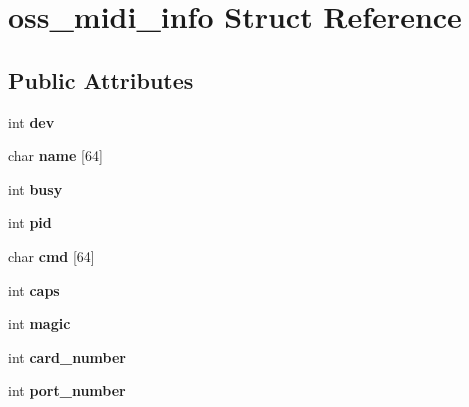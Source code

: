 \hypertarget{structoss__midi__info}{}\section{oss\+\_\+midi\+\_\+info Struct Reference}
\label{structoss__midi__info}
\subsection*{Public Attributes}
\begin{DoxyCompactItemize}
\item 
int {\bfseries dev}\hypertarget{structoss__midi__info_a9b878c6af6db4effdade6cef144bfed0}{}\label{structoss__midi__info_a9b878c6af6db4effdade6cef144bfed0}

\item 
char {\bfseries name} \mbox{[}64\mbox{]}\hypertarget{structoss__midi__info_a8613295b2ededa2d3bb5e0396fad5fbd}{}\label{structoss__midi__info_a8613295b2ededa2d3bb5e0396fad5fbd}

\item 
int {\bfseries busy}\hypertarget{structoss__midi__info_afddb92873545d2a67546df9b3ad240ee}{}\label{structoss__midi__info_afddb92873545d2a67546df9b3ad240ee}

\item 
int {\bfseries pid}\hypertarget{structoss__midi__info_a418280154a124e2a397e19dd9f7d7a6d}{}\label{structoss__midi__info_a418280154a124e2a397e19dd9f7d7a6d}

\item 
char {\bfseries cmd} \mbox{[}64\mbox{]}\hypertarget{structoss__midi__info_add46ae2d0ab2ab9c53c0112714bd2de9}{}\label{structoss__midi__info_add46ae2d0ab2ab9c53c0112714bd2de9}

\item 
int {\bfseries caps}\hypertarget{structoss__midi__info_add554c5c09f88d591745add6ace7e9d4}{}\label{structoss__midi__info_add554c5c09f88d591745add6ace7e9d4}

\item 
int {\bfseries magic}\hypertarget{structoss__midi__info_a7821717867fae437ba1e8604aebce467}{}\label{structoss__midi__info_a7821717867fae437ba1e8604aebce467}

\item 
int {\bfseries card\+\_\+number}\hypertarget{structoss__midi__info_a398641aa34f619c394607a5c831ddefe}{}\label{structoss__midi__info_a398641aa34f619c394607a5c831ddefe}

\item 
int {\bfseries port\+\_\+number}\hypertarget{structoss__midi__info_a90e93b39cf5c6f954a8459fa94d1e6a0}{}\label{structoss__midi__info_a90e93b39cf5c6f954a8459fa94d1e6a0}


\end{DoxyCompactItemize}
